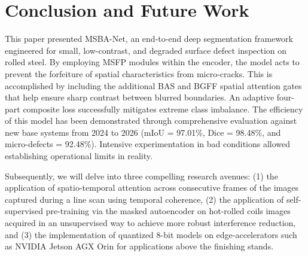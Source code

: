 \documentclass{ieeeaccess}
\begin{document}
\section{Conclusion and Future Work}
\label{sec:conclusion_future}
This paper presented MSBA-Net, an end-to-end deep segmentation framework engineered for small, low-contrast, and degraded surface defect inspection on rolled steel. By employing MSFP modules within the encoder, the model acts to prevent the forfeiture of spatial characteristics from micro-cracks. This is accomplished by including the additional BAS and BGFF spatial attention gates that help ensure sharp contrast between blurred boundaries. An adaptive four-part composite loss successfully mitigates extreme class imbalance. The efficiency of this model has been demonstrated through comprehensive evaluation against new base systems from 2024 to 2026 (mIoU = 97.01\%, Dice = 98.48\%, and micro-defects = 92.48\%). Intensive experimentation in bad conditions allowed establishing operational limits in reality.

Subsequently, we will delve into three compelling research avenues: (1) the application of spatio-temporal attention across consecutive frames of the images captured during a line scan using temporal coherence, (2) the application of self-supervised pre-training via the masked autoencoder on hot-rolled coils images acquired in an unsupervised way to achieve more robust interference reduction, and (3) the implementation of quantized 8-bit models on edge-accelerators such as NVIDIA Jetson AGX Orin for applications above the finishing stands\cite{edge_manufacturing2025}.
\end{document}
